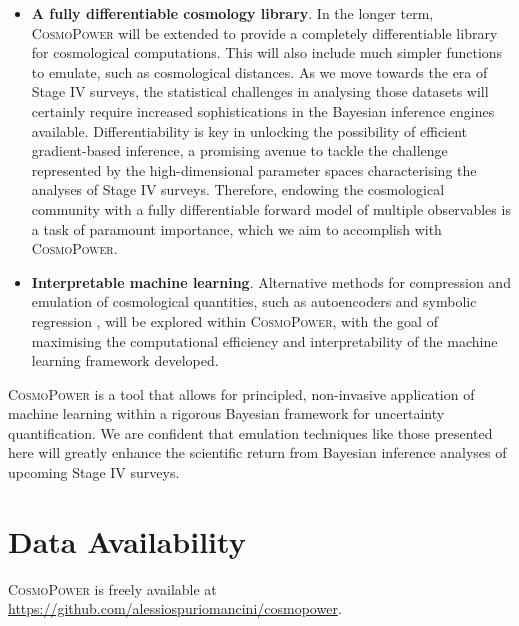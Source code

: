 \documentclass[fleqn,usenatbib]{mnras}
\begin{document}
\begin{itemize}
    \item \textbf{A fully differentiable cosmology library}. In the longer term, \textsc{CosmoPower} will be extended to provide a completely differentiable library for cosmological computations. This will also include much simpler functions to emulate, such as cosmological distances. As we move towards the era of Stage IV surveys, the statistical challenges in analysing those datasets will certainly require increased sophistications in the Bayesian inference engines available. Differentiability is key in unlocking the possibility of efficient gradient-based inference, a promising avenue to tackle the challenge represented by the high-dimensional parameter spaces characterising the analyses of Stage IV surveys. Therefore, endowing the cosmological community with a fully differentiable forward model of multiple observables is a task of paramount importance, which we aim to accomplish with \textsc{CosmoPower}.

\smallskip

   \item \textbf{Interpretable machine learning}. Alternative methods for compression and emulation of cosmological quantities, such as autoencoders and symbolic regression \citep{Udrescu20}, will be explored within \textsc{CosmoPower}, with the goal of maximising the computational efficiency and interpretability of the machine learning framework developed.
\end{itemize}

\textsc{CosmoPower} is a tool that allows for principled, non-invasive application of machine learning within a rigorous Bayesian framework for uncertainty quantification. We are confident that emulation techniques like those presented here will greatly enhance the scientific return from Bayesian inference analyses of upcoming Stage IV surveys.


\section*{Data Availability}
\textsc{CosmoPower} is freely available at \url{https://github.com/alessiospuriomancini/cosmopower}. 

\end{document}
